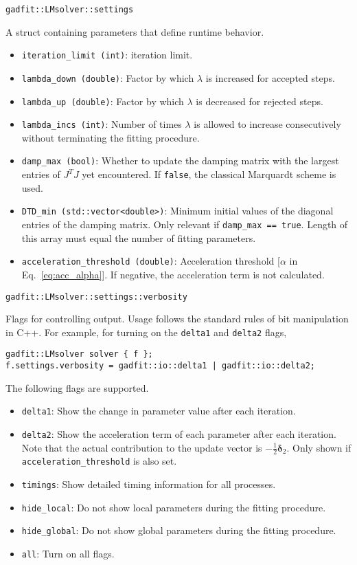 \documentclass{article}
\begin{document}
\begin{verbatim}
gadfit::LMsolver::settings
\end{verbatim}
A struct containing parameters that define runtime behavior.
\begin{itemize}
\item \verb+iteration_limit (int)+: iteration limit.
\item \verb+lambda_down (double)+: Factor by which $\lambda$ is increased for accepted steps.
\item \verb+lambda_up (double)+: Factor by which $\lambda$ is decreased for rejected steps.
\item \verb+lambda_incs (int)+: Number of times $\lambda$ is allowed to increase consecutively without terminating the fitting procedure.
\item \verb+damp_max (bool)+: Whether to update the damping matrix with the largest entries of $J^TJ$ yet encountered. If \texttt{false}, the classical Marquardt scheme is used.
\item \verb+DTD_min (std::vector<double>)+: Minimum initial values of the diagonal entries of the damping matrix. Only relevant if \verb+damp_max == true+. Length of this array must equal the number of fitting parameters.
\item \verb+acceleration_threshold (double)+: Acceleration threshold [$\alpha$ in Eq.~\eqref{eq:acc_alpha}]. If negative, the acceleration term is not calculated.
\end{itemize}

\begin{verbatim}
gadfit::LMsolver::settings::verbosity
\end{verbatim}
Flags for controlling output. Usage follows the standard rules of bit manipulation in C++. For example, for turning on the \verb+delta1+ and \verb+delta2+ flags,
\begin{verbatim}
gadfit::LMsolver solver { f };
f.settings.verbosity = gadfit::io::delta1 | gadfit::io::delta2;
\end{verbatim}
The following flags are supported.
\begin{itemize}
\item \verb+delta1+: Show the change in parameter value after each iteration.
\item \verb+delta2+: Show the acceleration term of each parameter after each iteration. Note that the actual contribution to the update vector is $-\frac{1}{2}\bm\delta_2$. Only shown if \verb+acceleration_threshold+ is also set.
\item \verb+timings+: Show detailed timing information for all processes.
\item \verb+hide_local+: Do not show local parameters during the fitting procedure.
\item \verb+hide_global+: Do not show global parameters during the fitting procedure.
\item \verb+all+: Turn on all flags.
\end{itemize}
\end{document}
